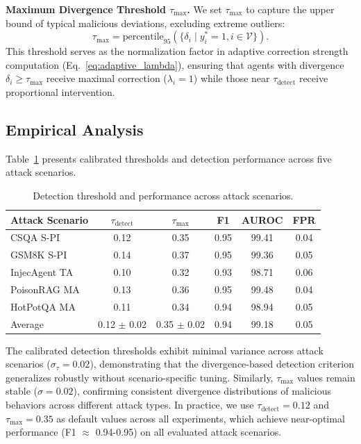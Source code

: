 \documentclass{article}
\theoremstyle{plain}
\theoremstyle{definition}
\theoremstyle{remark}
\begin{document}
\textbf{Maximum Divergence Threshold $\tau_{\text{max}}$.}
We set $\tau_{\text{max}}$ to capture the upper bound of typical malicious 
deviations, excluding extreme outliers:
\begin{equation}
\tau_{\text{max}} = \text{percentile}_{95}\left(\{\delta_i \mid y_i^* = 1, 
i \in \mathcal{V}\}\right).
\end{equation}
This threshold serves as the normalization factor in adaptive correction 
strength computation (Eq.~\eqref{eq:adaptive_lambda}), ensuring that agents 
with divergence $\delta_i \geq \tau_{\text{max}}$ receive maximal correction 
($\lambda_i = 1$) while those near $\tau_{\text{detect}}$ receive proportional 
intervention.

\subsection{Empirical Analysis}

Table~\ref{tab:threshold_analysis} presents calibrated thresholds and detection 
performance across five attack scenarios.

\begin{table}[h]
\centering
\caption{Detection threshold and performance across attack scenarios.}
\label{tab:threshold_analysis}
\small
\begin{tabular}{lccccc}
\toprule
Attack Scenario & $\tau_{\text{detect}}$ & $\tau_{\text{max}}$ & F1 & AUROC & FPR \\
\midrule
CSQA S-PI & 0.12 & 0.35 & 0.95 & 99.41 & 0.04 \\
GSM8K S-PI & 0.14 & 0.37 & 0.95 & 99.36 & 0.05 \\
InjecAgent TA & 0.10 & 0.32 & 0.93 & 98.71 & 0.06 \\
PoisonRAG MA & 0.13 & 0.36 & 0.95 & 99.48 & 0.04 \\
HotPotQA MA & 0.11 & 0.34 & 0.94 & 98.94 & 0.05 \\
\midrule
Average & 0.12 $\pm$ 0.02 & 0.35 $\pm$ 0.02 & 0.94 & 99.18 & 0.05 \\
\bottomrule
\end{tabular}
\end{table}

The calibrated detection thresholds exhibit minimal variance across attack 
scenarios ($\sigma_{\tau} = 0.02$), demonstrating that the divergence-based 
detection criterion generalizes robustly without scenario-specific tuning. 
Similarly, $\tau_{\text{max}}$ values remain stable ($\sigma = 0.02$), 
confirming consistent divergence distributions of malicious behaviors across 
different attack types. In practice, we use $\tau_{\text{detect}} = 0.12$ and 
$\tau_{\text{max}} = 0.35$ as default values across all experiments, which 
achieve near-optimal performance (F1 $\approx$ 0.94-0.95) on all evaluated 
attack scenarios.
\end{document}
